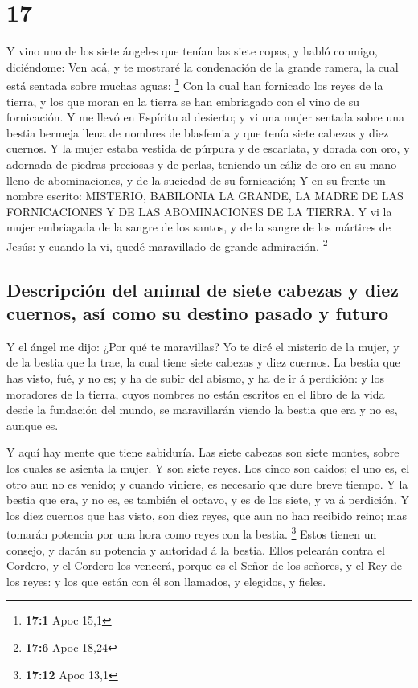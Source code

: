 \hypertarget{section-16}{%
\section{17}\label{section-16}}

 Y vino uno de los siete ángeles que tenían las siete copas,
y habló conmigo, diciéndome: Ven acá, y te mostraré la condenación de la
grande ramera, la cual está sentada sobre muchas aguas: \footnote{\textbf{17:1}
  Apoc 15,1}  Con la cual han fornicado los reyes de la
tierra, y los que moran en la tierra se han embriagado con el vino de su
fornicación.  Y me llevó en Espíritu al desierto; y vi una
mujer sentada sobre una bestia bermeja llena de nombres de blasfemia y
que tenía siete cabezas y diez cuernos.  Y la mujer estaba
vestida de púrpura y de escarlata, y dorada con oro, y adornada de
piedras preciosas y de perlas, teniendo un cáliz de oro en su mano lleno
de abominaciones, y de la suciedad de su fornicación;  Y en
su frente un nombre escrito: MISTERIO, BABILONIA LA GRANDE, LA MADRE DE
LAS FORNICACIONES Y DE LAS ABOMINACIONES DE LA TIERRA.  Y vi
la mujer embriagada de la sangre de los santos, y de la sangre de los
mártires de Jesús: y cuando la vi, quedé maravillado de grande
admiración. \footnote{\textbf{17:6} Apoc 18,24}

\hypertarget{descripciuxf3n-del-animal-de-siete-cabezas-y-diez-cuernos-asuxed-como-su-destino-pasado-y-futuro}{%
\subsection{Descripción del animal de siete cabezas y diez cuernos, así
como su destino pasado y
futuro}\label{descripciuxf3n-del-animal-de-siete-cabezas-y-diez-cuernos-asuxed-como-su-destino-pasado-y-futuro}}

 Y el ángel me dijo: ¿Por qué te maravillas? Yo te diré el
misterio de la mujer, y de la bestia que la trae, la cual tiene siete
cabezas y diez cuernos.  La bestia que has visto, fué, y no
es; y ha de subir del abismo, y ha de ir á perdición: y los moradores de
la tierra, cuyos nombres no están escritos en el libro de la vida desde
la fundación del mundo, se maravillarán viendo la bestia que era y no
es, aunque es.

 Y aquí hay mente que tiene sabiduría. Las siete cabezas son
siete montes, sobre los cuales se asienta la mujer.  Y son
siete reyes. Los cinco son caídos; el uno es, el otro aun no es venido;
y cuando viniere, es necesario que dure breve tiempo.  Y la
bestia que era, y no es, es también el octavo, y es de los siete, y va á
perdición.  Y los diez cuernos que has visto, son diez
reyes, que aun no han recibido reino; mas tomarán potencia por una hora
como reyes con la bestia. \footnote{\textbf{17:12} Apoc 13,1}
 Estos tienen un consejo, y darán su potencia y autoridad á
la bestia.  Ellos pelearán contra el Cordero, y el Cordero
los vencerá, porque es el Señor de los señores, y el Rey de los reyes: y
los que están con él son llamados, y elegidos, y fieles.

